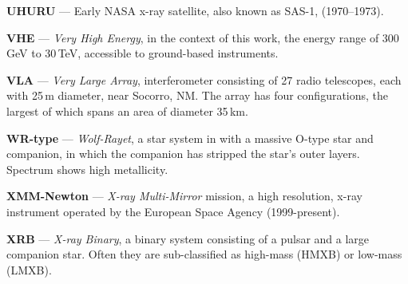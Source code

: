 \textbf{UHURU} --- Early NASA x-ray satellite, also known as SAS-1,
(1970--1973).

\textbf{VHE} --- \textit{Very High Energy}, in the context of this work,
the energy range of 300\,GeV to 30\,TeV, accessible to ground-based
\Gray instruments.

\textbf{VLA} --- \textit{Very Large Array}, interferometer consisting of 
27 radio telescopes, each with 25\,m diameter, near Socorro, NM. The
array has four configurations, the largest of which spans an area of
diameter 35\,km.

\textbf{WR-type} --- \textit{Wolf-Rayet}, a star system in with a massive 
O-type star and companion, in which the companion has stripped the star's
outer layers. Spectrum shows high metallicity.

\textbf{XMM-Newton} --- \textit{X-ray Multi-Mirror} mission, a 
high resolution, x-ray instrument operated by the European Space
Agency (1999-present).

\textbf{XRB} --- \textit{X-ray Binary}, a binary system consisting of
a pulsar and a large companion star. Often they are sub-classified as
high-mass (HMXB) or low-mass (LMXB).
